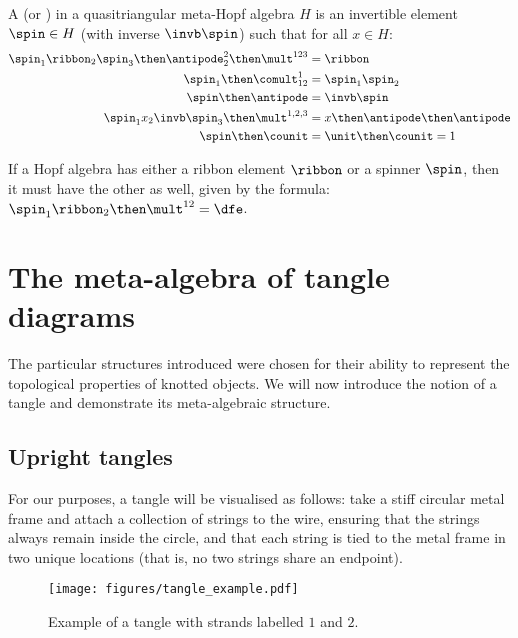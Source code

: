 \begin{definition}
        A  (or ) in a
        quasitriangular meta-Hopf algebra $H$ is an invertible element
        $\spin\in H$ (with inverse $\invb\spin$) such that for all $x\in H$:
        \begin{align}
                \label{eq:spinner_ribbon}
                \spin_1\ribbon_2\spin_3 \then \antipode^2_2 \then \mult^{123} &=
                \ribbon\\
                \label{eq:spinner_comult}
                \spin_1\then\comult^{1}_{12} &=\spin_1\spin_2\\
                \label{eq:spinner_antipode}
                \spin \then\antipode &= \invb\spin\\
                \label{eq:spinner_conjugate}
                \spin_{1}x_2\invb\spin_{3}\then\mult^{1,2,3} &=
                x \then \antipode \then \antipode\\
                \label{eq:spinner_counit}
                \spin \then \counit &= \unit \then \counit = 1
        \end{align}
\end{definition}

\begin{lemma}\label{lem:spinner_ribbon}
        If a Hopf algebra has either a ribbon element $\ribbon$ or a spinner
        $\spin$, then it must have the other as well, given by the formula:
        $\spin_1 \ribbon_2 \then \mult^{12} = \dfe$.
\end{lemma}

\section{The meta-algebra of tangle diagrams}
\label{sec:topological_interpretations}

The particular structures introduced were chosen for their ability to represent
the topological properties of knotted objects. We will now introduce the notion
of a tangle and demonstrate its meta-algebraic structure.

\subsection{Upright tangles}

For our purposes, a tangle will be visualised as follows: take a stiff circular
metal frame and attach a collection of strings to the wire, ensuring that the
strings always remain inside the circle, and that each string is tied to the
metal frame in two unique locations (that is, no two strings share an endpoint).
\begin{figure}[h]
        \centering
        \texttt{[image: figures/tangle\_example.pdf]}
        \caption{Example of a tangle with strands labelled $1$ and $2$.}
        \label{fig:tangle_example}
\end{figure}

